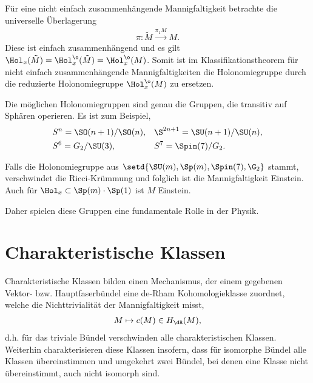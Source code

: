 \documentclass[%
	paper=a5,%
	fleqn,%
	DIV=18,%
	BCOR=0mm,
	fontsize=11pt,
	titlepage=false,%
	bibliography=totoc,
	DIV=18,%
	twoside=true,
	pdftitle=Riemannsche Geometrie,
	pdfauthor=Uwe Semmelmann,
	numbers=noendperiod]%
	{scrbook}
\begin{document}
\begin{rem}[Bemerkungen.]
\begin{remenum}
\item
Für eine nicht einfach zusammenhängende Mannigfaltigkeit betrachte die
universelle Überlagerung
\begin{align*}
\pi: \tilde M \overset{\pi_1 M}{\longrightarrow} M.
\end{align*}
Diese ist einfach zusammenhängend und es gilt $\Hol_x(\tilde{M})
=\Hol_x^\o(\tilde{M}) = \Hol_x^\o(M)$. Somit ist im Klassifikationstheorem für
nicht einfach zusammenhängende Mannigfaltigkeiten die Holonomiegruppe durch die
reduzierte Holonomiegruppe $\Hol_x^\o(M)$ zu ersetzen.
\item Die möglichen Holonomiegruppen sind genau die Gruppen, die transitiv auf
Sphären operieren. Es ist zum Beispiel,
\begin{align*}
&S^n  =\SO(n+1)/\SO(n),&& \S^{2n+1} = \SU(n+1)/\SU(n),\\
&S^6 = G_2/\SU(3), && S^7 = \Spin(7)/G_2.
\end{align*}
\item Falls die Holonomiegruppe aus $\setd{\SU(m),\Sp(m),\Spin(7),\G_2}$ stammt,
verschwindet die Ricci-Krümmung und folglich ist die Mannigfaltigkeit Einstein.
Auch für $\Hol_x\subset \Sp(m)\cdot \Sp(1)$ ist $M$ Einstein.

Daher spielen diese Gruppen eine fundamentale Rolle in der Physik.\map  
\end{remenum}
\end{rem}

\chapter{Charakteristische Klassen}

Charakteristische Klassen bilden einen Mechanismus, der einem gegebenen Vektor-
bzw. Hauptfaserbündel eine de-Rham Kohomologieklasse zuordnet,
welche die Nichttrivialität der Mannigfaltigkeit misst,
\begin{align*}
M\mapsto c(M)\in H_\dR(M),
\end{align*}
d.h. für das triviale Bündel verschwinden alle charakteristischen Klassen.
Weiterhin charakterisieren diese Klassen insofern, dass für isomorphe Bündel
alle Klassen übereinstimmen und umgekehrt zwei Bündel, bei denen eine Klasse
nicht übereinstimmt, auch nicht isomorph sind.
\end{document}
